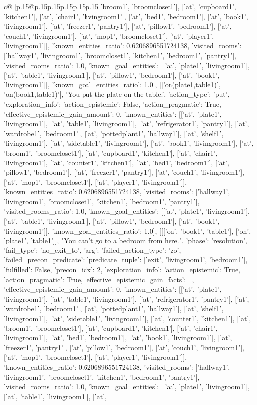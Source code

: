 \documentclass{article}
\begin{document}
{\begin{supertabular}{c@{$\;$}|p{.15\linewidth}@{}p{.15\linewidth}p{.15\linewidth}p{.15\linewidth}p{.15\linewidth}p{.15\linewidth}}
{{{'broom1', 'broomcloset1'], ['at', 'cupboard1', 'kitchen1'], ['at', 'chair1', 'livingroom1'], ['at', 'bed1', 'bedroom1'], ['at', 'book1', 'livingroom1'], ['at', 'freezer1', 'pantry1'], ['at', 'pillow1', 'bedroom1'], ['at', 'couch1', 'livingroom1'], ['at', 'mop1', 'broomcloset1'], ['at', 'player1', 'livingroom1']], 'known_entities_ratio': 0.6206896551724138, 'visited_rooms': ['hallway1', 'livingroom1', 'broomcloset1', 'kitchen1', 'bedroom1', 'pantry1'], 'visited_rooms_ratio': 1.0, 'known_goal_entities': [['at', 'plate1', 'livingroom1'], ['at', 'table1', 'livingroom1'], ['at', 'pillow1', 'bedroom1'], ['at', 'book1', 'livingroom1']], 'known_goal_entities_ratio': 1.0}}], [['on(plate1,table1)', 'on(book1,table1)'], 'You put the plate on the table.', {'action_type': 'put', 'exploration_info': {'action_epistemic': False, 'action_pragmatic': True, 'effective_epistemic_gain_amount': 0, 'known_entities': [['at', 'plate1', 'livingroom1'], ['at', 'table1', 'livingroom1'], ['at', 'refrigerator1', 'pantry1'], ['at', 'wardrobe1', 'bedroom1'], ['at', 'pottedplant1', 'hallway1'], ['at', 'shelf1', 'livingroom1'], ['at', 'sidetable1', 'livingroom1'], ['at', 'book1', 'livingroom1'], ['at', 'broom1', 'broomcloset1'], ['at', 'cupboard1', 'kitchen1'], ['at', 'chair1', 'livingroom1'], ['at', 'counter1', 'kitchen1'], ['at', 'bed1', 'bedroom1'], ['at', 'pillow1', 'bedroom1'], ['at', 'freezer1', 'pantry1'], ['at', 'couch1', 'livingroom1'], ['at', 'mop1', 'broomcloset1'], ['at', 'player1', 'livingroom1']], 'known_entities_ratio': 0.6206896551724138, 'visited_rooms': ['hallway1', 'livingroom1', 'broomcloset1', 'kitchen1', 'bedroom1', 'pantry1'], 'visited_rooms_ratio': 1.0, 'known_goal_entities': [['at', 'plate1', 'livingroom1'], ['at', 'table1', 'livingroom1'], ['at', 'pillow1', 'bedroom1'], ['at', 'book1', 'livingroom1']], 'known_goal_entities_ratio': 1.0}}], [[['on', 'book1', 'table1'], ['on', 'plate1', 'table1']], "You can't go to a bedroom from here.", {'phase': 'resolution', 'fail_type': 'no_exit_to', 'arg': {'failed_action_type': 'go', 'failed_precon_predicate': {'predicate_tuple': ['exit', 'livingroom1', 'bedroom1'], 'fulfilled': False, 'precon_idx': 2}}, 'exploration_info': {'action_epistemic': True, 'action_pragmatic': True, 'effective_epistemic_gain_facts': [], 'effective_epistemic_gain_amount': 0, 'known_entities': [['at', 'plate1', 'livingroom1'], ['at', 'table1', 'livingroom1'], ['at', 'refrigerator1', 'pantry1'], ['at', 'wardrobe1', 'bedroom1'], ['at', 'pottedplant1', 'hallway1'], ['at', 'shelf1', 'livingroom1'], ['at', 'sidetable1', 'livingroom1'], ['at', 'counter1', 'kitchen1'], ['at', 'broom1', 'broomcloset1'], ['at', 'cupboard1', 'kitchen1'], ['at', 'chair1', 'livingroom1'], ['at', 'bed1', 'bedroom1'], ['at', 'book1', 'livingroom1'], ['at', 'freezer1', 'pantry1'], ['at', 'pillow1', 'bedroom1'], ['at', 'couch1', 'livingroom1'], ['at', 'mop1', 'broomcloset1'], ['at', 'player1', 'livingroom1']], 'known_entities_ratio': 0.6206896551724138, 'visited_rooms': ['hallway1', 'livingroom1', 'broomcloset1', 'kitchen1', 'bedroom1', 'pantry1'], 'visited_rooms_ratio': 1.0, 'known_goal_entities': [['at', 'plate1', 'livingroom1'], ['at', 'table1', 'livingroom1'], ['at', }}}
\end{supertabular}}
\end{document}
